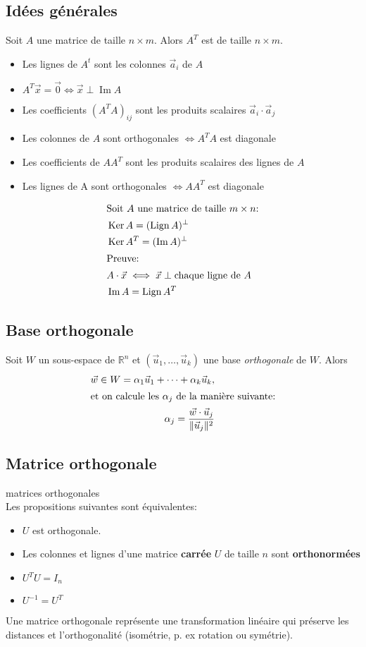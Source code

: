 \documentclass{article}
\numberwithin{equation}{section}
\newcommand\thm[1]{\vspace{4px}\noindent \quad {\large \underline{\textsc{Théorème #1}}: }}
\providecommand{\norm}[1]{\lVert#1\rVert}
\DeclareMathOperator{\im}{Im}
\DeclareMathOperator{\ke}{Ker}
\DeclareMathOperator{\lign}{Lign}
\begin{document}
\subsection{Idées générales}

Soit $A$ une matrice de taille $n \times m$. Alors $A^T$ est de taille $n \times m$.
\begin{itemize}
	\item Les lignes de $A^t$ sont les colonnes $\vec a_i$ de $A$
	\item $A^T\vec x = \vec 0 \iff \vec x \perp \im A$
	\item Les coefficients $(A^TA)_{ij}$ sont les produits scalaires $\vec a_i \cdot \vec a_j$
	\item Les colonnes de $A$ sont orthogonales $\iff A^TA$ est diagonale
	\item Les coefficients de $AA^T$ sont les produits scalaires des lignes de $A$
	\item Les lignes de A sont orthogonales $\iff AA^T$ est diagonale
\end{itemize}

\begin{align}
\shortintertext{Soit \(A\) une matrice de taille \(m \times n\):}
	&\ke A = (\lign A)^\perp \\
	&\ke A^T = 	(\im A)^\perp \\
\shortintertext{Preuve:}
	\nonumber &A \cdot \vec x \iff \vec x \perp \text{chaque ligne de } A \\
	\nonumber &\im A = \lign A^T
\end{align}

\subsection{Base orthogonale}
Soit \(W\) un sous-espace de \(\mathbb{R}^n\) et \((\vec u_1, \dots, \vec u_k)\) une base \emph{orthogonale} de \(W\). Alors
\begin{align}
	\vec w \in W = \alpha_1\vec u_1 + \dots + \alpha_k\vec u_k, \\
\intertext{et on calcule les $\alpha_j$ de la manière suivante:}
	\label{eq:orthoproj} \alpha_j = \dfrac{\vec w \cdot \vec u_j}{\norm{\vec u_j}^2}
\end{align}

\subsection{Matrice orthogonale}
\thm{} matrices orthogonales \\
Les propositions suivantes sont équivalentes:
\begin{itemize}
	\item $U$ est orthogonale.
	\item Les colonnes et lignes d'une matrice \textbf{carrée} $U$ de taille $n$ sont \textbf{orthonormées}
	\item $U^TU = I_n$
	\item $U^{-1} = U^T$
\end{itemize}
Une matrice orthogonale représente une transformation linéaire qui préserve les distances et l'orthogonalité (isométrie, p. ex rotation ou symétrie). \\
\end{document}
